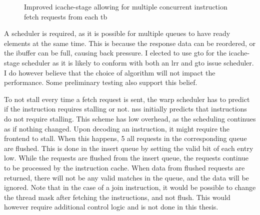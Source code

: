 \begin{figure}
    \centering
    \caption[Illustration of the improved icache-stage.]{Improved icache-stage allowing for multiple concurrent instruction fetch requests from each \acrshort{tb}}
    \label{fig:new_icache_stage}
\end{figure}

A scheduler is required, as it is possible for multiple queues to have ready elements at the same time. This is because the response data can be reordered, or the ibuffer can be full, causing back pressure. I elected to use \acrshort{gto} for the icache-stage scheduler as it is likely to conform with both an \acrshort{lrr} and \acrshort{gto} issue scheduler. I do however believe that the choice of algorithm will not impact the performance. Some preliminary testing also support this belief.

To not stall every time a fetch request is sent, the warp scheduler has to predict if the instruction requires stalling or not. \acrshort{nss} initially predicts that instructions do not require stalling. This scheme has low overhead, as the scheduling continues as if nothing changed. Upon decoding an instruction, it might require the frontend to stall. When this happens, \textcircled{\small{5}} all requests in the corresponding queue are flushed. This is done in the insert queue by setting the valid bit of each entry low. While the requests are flushed from the insert queue, the requests continue to be processed by the instruction cache. When data from flushed requests are returned, there will not be any valid matches in the queue, and the data will be ignored. Note that in the case of a join instruction, it would be possible to change the thread mask after fetching the instructions, and not flush. This would however require additional control logic and is not done in this thesis.   

